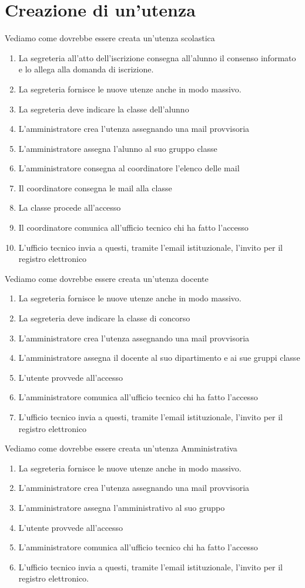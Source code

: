 \section{Creazione di un'utenza}
Vediamo come dovrebbe essere creata un'utenza scolastica
\begin{enumerate}
	\item La segreteria all'atto dell'iscrizione consegna all'alunno il consenso
	informato e lo allega alla domanda di iscrizione.
	\item La segreteria fornisce le nuove utenze anche in modo massivo.
	\item La segreteria deve indicare la classe dell'alunno
	\item L'amministratore crea l'utenza assegnando una mail provvisoria
	\item L'amministratore assegna l'alunno al suo gruppo classe
	\item L'amministratore consegna al coordinatore l'elenco delle mail
	\item Il coordinatore  consegna le mail alla classe 
	\item La classe procede all'accesso
	\item Il coordinatore comunica all'ufficio tecnico chi ha fatto l'accesso
	\item L'ufficio tecnico invia  a questi, tramite l'email istituzionale, 
	l'invito  per il registro elettronico
\end{enumerate}
Vediamo come dovrebbe essere creata un'utenza docente
\begin{enumerate}
	\item La segreteria fornisce le nuove utenze anche in modo massivo.
	\item La segreteria deve indicare la classe di concorso
	\item L'amministratore crea l'utenza assegnando una mail provvisoria
	\item L'amministratore assegna il docente al suo dipartimento e ai sue 
	gruppi  classe
	\item L'utente provvede all'accesso
	\item L'amministratore  comunica all'ufficio tecnico chi ha fatto l'accesso
	\item L'ufficio tecnico invia  a questi, tramite l'email istituzionale, 
	l'invito  per il registro elettronico
\end{enumerate}
Vediamo come dovrebbe essere creata un'utenza Amministrativa
\begin{enumerate}
	\item La segreteria fornisce le nuove utenze anche in modo massivo.
	\item L'amministratore crea l'utenza assegnando una mail provvisoria
	\item L'amministratore assegna l'amministrativo al suo gruppo
	\item L'utente provvede all'accesso
	\item L'amministratore  comunica all'ufficio tecnico chi ha fatto l'accesso
	\item L'ufficio tecnico invia  a questi, tramite l'email istituzionale, 
	l'invito  per il registro elettronico.
\end{enumerate}
